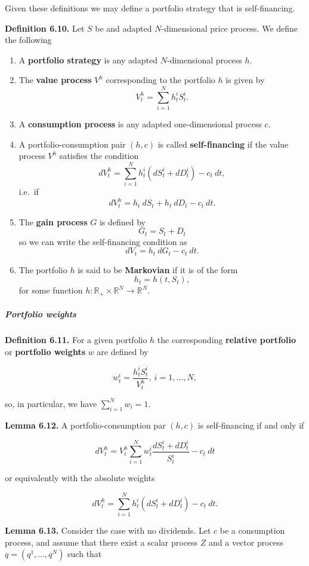 \documentclass[
]{article}
\providecommand{\tightlist}{%
  \setlength{\itemsep}{0pt}\setlength{\parskip}{0pt}}
\begin{document}
Given these definitions we may define a portfolio strategy that is
self-financing.

\textbf{Definition 6.10.} Let \(S\) be and adapted \(N\)-dimensional
price process. We define the following

\begin{enumerate}
\def\labelenumi{\arabic{enumi}.}
\tightlist
\item
  A \textbf{portfolio strategy} is any adapted \(N\)-dimensional process
  \(h\).
\item
  The \textbf{value process} \(V^h\) corresponding to the portfolio
  \(h\) is given by \[
    V_t^h=\sum_{i=1}^N h_t^iS_t^i.
    \]
\item
  A \textbf{consumption process} is any adapted one-dimensional process
  \(c\).
\item
  A portfolio-consumption pair \((h,c)\) is called
  \textbf{self-financing} if the value process \(V^h\) satisfies the
  condition \[
    dV_t^h=\sum_{i=1}^N h_t^i(dS_t^i+d D^i_t)-c_t\ dt,
    \] i.e.~if \[
    dV_t^h=h_t\ dS_t + h_t\ dD_t -c_t\ dt.
    \]
\item
  The \textbf{gain process} \(G\) is defined by \[
    G_t=S_t+D_t
    \] so we can write the self-financing condition as \[
    dV_t=h_t\ dG_t-c_t\ dt.
    \]
\item
  The portfolio \(h\) is said to be \textbf{Markovian} if it is of the
  form \[
    h_t=h(t,S_t),
    \] for some function
  \(h : \mathbb{R}_+\times \mathbb{R}^N\to\mathbb{R}^N\).
\end{enumerate}

\hypertarget{portfolio-weights}{%
\subparagraph{Portfolio weights}\label{portfolio-weights}}

\textbf{Definition 6.11.} For a given portfolio \(h\) the corresponding
\textbf{relative portfolio} or \textbf{portfolio weights} \(w\) are
defined by

\[
w_t^i=\frac{h_t^iS_t^i}{V_t^h},\ i=1,...,N,
\]

so, in particular, we have \(\sum_{i=1}^N w_i=1\).

\textbf{Lemma 6.12.} A portfolio-consumption par \((h,c)\) is
self-financing if and only if

\[
dV_t^h=V_t^h\sum_{i=1}^N w_t^i\frac{dS_t^i+dD_t^i}{S_t^i}-c_t\ dt
\]

or equivalently with the absolute weights

\[
dV_t^h=\sum_{i=1}^N h_t^i(dS_t^i+dD_t^i)-c_t\ dt.
\]

\textbf{Lemma 6.13.} Consider the case with no dividends. Let \(c\) be a
consumption process, and assume that there exist a scalar process \(Z\)
and a vector process \(q=(q^1,...,q^N)\) such that
\end{document}
